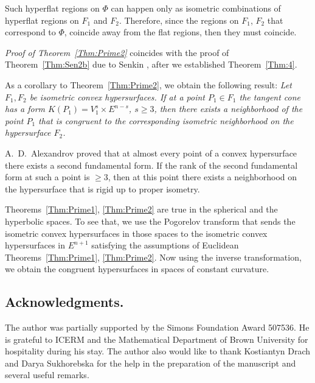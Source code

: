 \documentclass[11pt,oneside]{amsart}
\theoremstyle{theorem}
\theoremstyle{definition}
\theoremstyle{remark}
\begin{document}
Such hyperflat regions on $\Phi$ can happen only as isometric combinations of hyperflat regions on $F_1$ and $F_2$. Therefore, since the regions on $F_1$, $F_2$ that correspond to $\Phi$, coincide away from the flat regions, then they must coincide.

\textit{Proof of Theorem~\ref{Thm:Prime2}} coincides with the proof of Theorem~\ref{Thm:Sen2b} due to Senkin \cite{Sen2}, \cite{Sen3} after we established Theorem~\ref{Thm:4}.

As a corollary to Theorem~\ref{Thm:Prime2}, we obtain the following result: \textit{Let $F_1, F_2$ be isometric convex hypersurfaces. If at a point $P_1 \in F_1$ the tangent cone has a form $K(P_1) = V_1^s \times E^{n-s}$, $s \ge 3$, then there exists a neighborhood of the point $P_1$ that is congruent to the corresponding isometric neighborhood on the hypersurface $F_2$.}

A.~D.~Alexandrov proved that at almost every point of a convex hypersurface there exists a second fundamental form. If the rank of the second fundamental form at such a point is $\ge 3$, then at this point there exists a neighborhood on the hypersurface that is rigid up to proper isometry.

Theorems~\ref{Thm:Prime1}, \ref{Thm:Prime2} are true in the spherical and the hyperbolic spaces. To see that, we use the Pogorelov transform that sends the isometric convex hypersurfaces in those spaces to the isometric convex hypersurfaces in $E^{n+1}$ satisfying the assumptions of Euclidean Theorems~\ref{Thm:Prime1}, \ref{Thm:Prime2}. Now using the inverse transformation, we obtain the congruent hypersurfaces in spaces of constant curvature.  



\subsection*{Acknowledgments.} 
The author was partially supported by the Simons Foundation Award 507536. He is grateful to ICERM and the Mathematical Department of Brown University for hospitality during his stay. The author also would like to thank Kostiantyn Drach and Darya Sukhorebska  for the  help in the preparation of the manuscript and several useful remarks.
\end{document}
